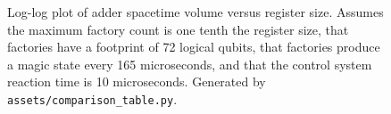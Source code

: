 \documentclass[onecolumn,unpublished]{quantumarticle}
\theoremstyle{definition}
\theoremstyle{definition}
\theoremstyle{definition}
\begin{document}
\begin{figure}
    \centering
    \endminipage
    \endminipage
    \caption{
        Log-log plot of adder spacetime volume versus register size. Assumes the maximum factory count is one tenth the register size, that factories have a footprint of 72 logical qubits, that factories produce a magic state every 165 microseconds, and that the control system reaction time is 10 microseconds.
        Generated by \texttt{assets/comparison\_table.py}.
    }
    \label{fig:size_versus_volume}
\end{figure}
\end{document}
